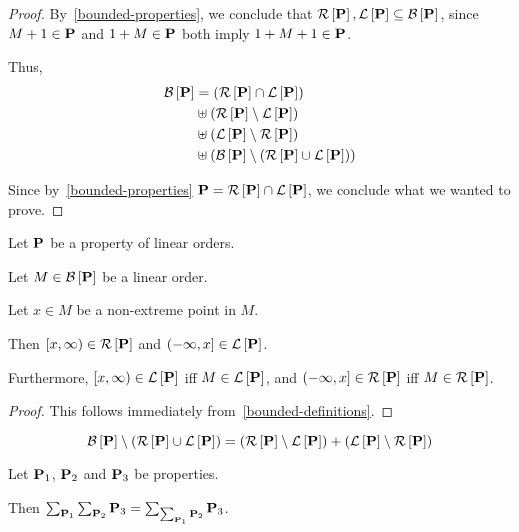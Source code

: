 \begin{proof}
  By~\cref{bounded-properties}, we conclude that
  $\lb{\pp}, \rb{\pp} \subseteq \bounded{\pp}$,
  since $M + 1 \in \pp$ and $1 + M \in \pp$ both imply $1 + M + 1 \in \pp$.

  Thus,
  \[
    \begin{aligned}
      \bounded{\pp} & = \ps{\lb{\pp} \cap \rb{\pp}}                                    \\
                    & \uplus \ps{\lb{\pp} \setminus \rb{\pp}}                          \\
                    & \uplus \ps{\rb{\pp} \setminus \lb{\pp}}                          \\
                    & \uplus \ps{ \bounded{\pp} \setminus \ps{\lb{\pp} \cup \rb{\pp}}}
    \end{aligned}
  \]

  Since by~\cref{bounded-properties} $\pp = \lb{\pp} \cap \rb{\pp}$,
  we conclude what we wanted to prove.
\end{proof}

\begin{lemma}
  Let $\pp$ be a property of linear orders.

  Let $M \in \bounded{\pp}$ be a linear order.

  Let $x \in M$ be a non-extreme point in $M$.

  Then $[x, \infty) \in \lb{\pp}$ and $(-\infty, x] \in \rb{\pp}$.

  Furthermore, $[x, \infty) \in \rb{\pp}$ iff $M \in \rb{\pp}$,
          and $(-\infty, x] \in \lb{\pp}$ iff $M \in \lb{\pp}$.
\end{lemma}

\begin{proof}
  This follows immediately from~\cref{bounded-definitions}.
\end{proof}

\begin{corollary}\label{bounded-is-right-plus-left}
  \[
    \bounded{\pp} \setminus \ps{\lb{\pp} \cup \rb{\pp}}
    = \ps{\lb{\pp} \setminus \rb{\pp}} + \ps{\rb{\pp} \setminus \lb{\pp}}
  \]
\end{corollary}

\begin{lemma}
  Let $\pp_1$, $\pp_2$ and $\pp_3$ be properties.

  Then $\sum_{\pp_1}{\sum_{\pp_2}{\pp_3}} = \sum_{\sum_{\pp_1}{\pp_2}}{\pp_3}$.
\end{lemma}

